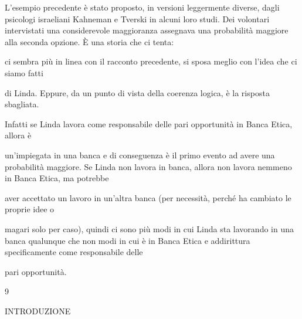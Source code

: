 \documentclass[a4paper,portrait,12pt]{article}
\begin{document}
\begin{flushleft}
L'esempio precedente \`{e} stato proposto, in versioni leggermente diverse, dagli psicologi israeliani Kahneman e Tverski in alcuni loro studi. Dei volontari intervistati una considerevole maggioranza assegnava una probabilit\`{a} maggiore alla seconda opzione. \`{E} una storia che ci tenta:
\end{flushleft}


\begin{flushleft}
ci sembra più in linea con il racconto precedente, si sposa meglio con l'idea che ci siamo fatti
\end{flushleft}


\begin{flushleft}
di Linda. Eppure, da un punto di vista della coerenza logica, \`{e} la risposta sbagliata.
\end{flushleft}


\begin{flushleft}
Infatti se Linda lavora come responsabile delle pari opportunit\`{a} in Banca Etica, allora \`{e}
\end{flushleft}


\begin{flushleft}
un'impiegata in una banca e di conseguenza \`{e} il primo evento ad avere una probabilit\`{a} maggiore. Se Linda non lavora in banca, allora non lavora nemmeno in Banca Etica, ma potrebbe
\end{flushleft}


\begin{flushleft}
aver accettato un lavoro in un'altra banca (per necessit\`{a}, perch\'{e} ha cambiato le proprie idee o
\end{flushleft}


\begin{flushleft}
magari solo per caso), quindi ci sono più modi in cui Linda sta lavorando in una banca qualunque che non modi in cui \`{e} in Banca Etica e addirittura specificamente come responsabile delle
\end{flushleft}


\begin{flushleft}
pari opportunit\`{a}.
\end{flushleft}


9










\begin{flushleft}
INTRODUZIONE
\end{flushleft}
\end{document}
